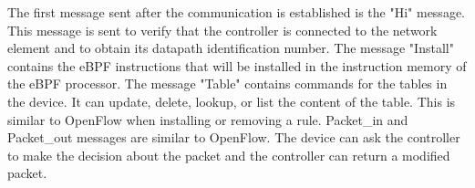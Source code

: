 The first message sent after the communication is established is the "Hi" message. 
This message is sent to verify that the controller is connected to the network element and to obtain its datapath identification number. 
The message "Install" contains the eBPF instructions that will be installed in the instruction memory of the eBPF processor. 
The message "Table" contains commands for the tables in the device. It can update, delete, lookup, or list the content of the table. This is similar to OpenFlow when installing or removing a rule.
Packet\_in and Packet\_out messages are similar to OpenFlow. The device can ask the controller to make the decision about the packet and the controller can return a modified packet.


